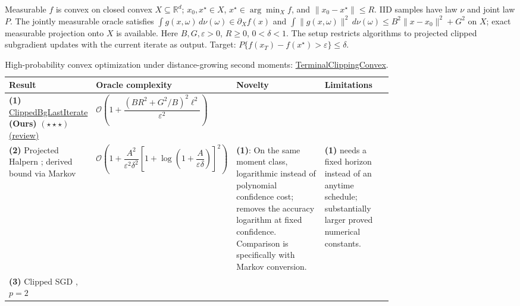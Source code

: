\begin{table}[tp]
\centering
\caption{High-probability convex optimization under distance-growing second moments: \href{https://github.com/k3nfalt/longtails/blob/main/LongTails/Setups/TerminalClippingConvex.lean}{TerminalClippingConvex}.}\label{tab:TerminalClippingConvex}
\parbox{\linewidth}{\footnotesize Measurable $f$ is convex on closed convex $X\subseteq\mathbb R^d$; $x_0,x^\star\in X$, $x^\star\in\arg\min_X f$, and $\|x_0-x^\star\|\le R$. IID samples have law $\nu$ and joint law $P$. The jointly measurable oracle satisfies $\int g(x,\omega)\,d\nu(\omega)\in\partial_X f(x)$ and $\int\|g(x,\omega)\|^2\,d\nu(\omega)\le B^2\|x-x_0\|^2+G^2$ on $X$; exact measurable projection onto $X$ is available. Here $B,G,\varepsilon>0$, $R\ge0$, $0<\delta<1$. The setup restricts algorithms to projected clipped subgradient updates with the current iterate as output. Target: $P\{f(x_T)-f(x^\star)>\varepsilon\}\le\delta$.}\par\smallskip
\begin{threeparttable}
\footnotesize
\setlength{\tabcolsep}{4pt}\renewcommand{\arraystretch}{1.25}
\begin{tabularx}{\linewidth}{@{}>{\raggedright\arraybackslash}p{0.20\linewidth}>{\raggedright\arraybackslash}p{0.32\linewidth}>{\raggedright\arraybackslash}p{0.23\linewidth}>{\raggedright\arraybackslash}X@{}}
\toprule
\textbf{Result} & \textbf{Oracle complexity} & \textbf{Novelty} & \textbf{Limitations} \\
\midrule
\textbf{(1)} \href{https://github.com/k3nfalt/longtails/blob/main/LongTails/Theorems/ClippedBgLastIterate.lean}{Clipped\allowbreak Bg\allowbreak Last\allowbreak Iterate} \textbf{(Ours)} $(\star\star\star)$ \href{https://github.com/k3nfalt/longtails/blob/main/scripts/reviews/ClippedBgLastIterate.md}{(review)}
& $\mathcal{O}\!\left(1+\dfrac{(BR^2+G^2/B)^2\ell^2}{\varepsilon^2}\right)$ & & \\
\midrule[1.2pt]
\textbf{(2)} Projected Halpern \citep[Thm.~3.6]{tcAMW2026v3}; derived bound via Markov
& $\mathcal{O}\!\left(1+\dfrac{A^2}{\varepsilon^2\delta^2}\left[1+\log\!\left(1+\dfrac{A}{\varepsilon\delta}\right)\right]^2\right)$
& \textbf{(1)}: On the same moment class, logarithmic instead of polynomial confidence cost; removes the accuracy logarithm at fixed confidence. Comparison is specifically with Markov conversion.
& \textbf{(1)} needs a fixed horizon instead of an anytime schedule; substantially larger proved numerical constants. \\
\midrule
\textbf{(3)} Clipped SGD \citep[Thm.~3]{tcLZ2023v3}, $p=2$

\end{tabularx}
\end{threeparttable}
\end{table}

